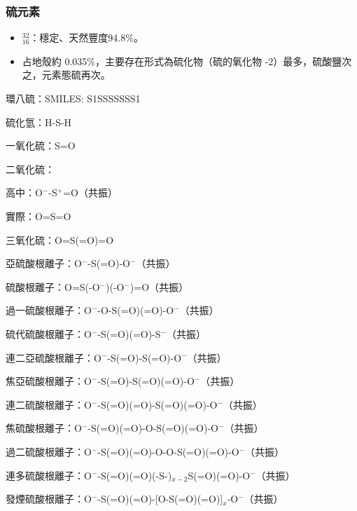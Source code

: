 \documentclass[a4paper,12pt]{report}
\begin{document}
\subsubsection{硫元素}
\begin{itemize}
\item $^{32}_ {16}$\rmS：穩定、天然豐度94.8\%。
\item 占地殼約 0.035\%，主要存在形式為硫化物（硫的氧化物 -2）最多，硫酸鹽次之，元素態硫再次。
\end{itemize}
\bit
\item 環八硫：SMILES: S1SSSSSSS1
\item 硫化氫：H-S-H
\item 一氧化硫：S=O
\item 二氧化硫：
\bit
\item 高中：O$^-$-S$^+$=O（共振）
\item 實際：O=S=O
\eit
\item 三氧化硫：O=S(=O)=O
\item 亞硫酸根離子：O$^-$-S(=O)-O$^-$（共振）
\item 硫酸根離子：O=S(-O$^-$)(-O$^-$)=O（共振）
\item 過一硫酸根離子：O$^-$-O-S(=O)(=O)-O$^-$（共振）
\item 硫代硫酸根離子：O$^-$-S(=O)(=O)-S$^-$（共振）
\item 連二亞硫酸根離子：O$^-$-S(=O)-S(=O)-O$^-$（共振）
\item 焦亞硫酸根離子：O$^-$-S(=O)-S(=O)(=O)-O$^-$（共振）
\item 連二硫酸根離子：O$^-$-S(=O)(=O)-S(=O)(=O)-O$^-$（共振）
\item 焦硫酸根離子：O$^-$-S(=O)(=O)-O-S(=O)(=O)-O$^-$（共振）
\item 過二硫酸根離子：O$^-$-S(=O)(=O)-O-O-S(=O)(=O)-O$^-$（共振）
\item 連多硫酸根離子：O$^-$-S(=O)(=O)(-S-)$_{x-2}$S(=O)(=O)-O$^-$（共振）
\item 發煙硫酸根離子：O$^-$-S(=O)(=O)-[O-S(=O)(=O)]$_x$-O$^-$（共振）
\eit
\end{document}
